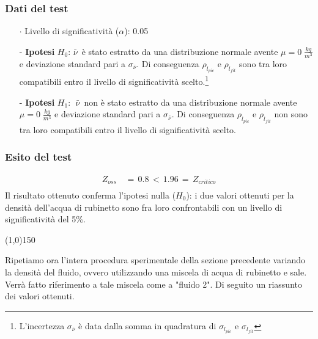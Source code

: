 \documentclass{article}
\begin{document}
\subsubsection{Dati del test}
\begin{itemize}
    \item [$\cdot$] Livello di significatività ($\alpha$): 0.05
    \item [-] \textbf{Ipotesi} $H_0$: $\bar{\nu}\,$ è stato estratto da una distribuzione normale avente $\mu = 0\;\frac{kg}{m^3}$ e deviazione standard pari a $\sigma_{\bar{\nu}}$. Di conseguenza $\rho_{l_{pic}}$ e $\rho_{l_{fit}}$ sono tra loro compatibili entro il livello di significatività scelto.\footnote{L'incertezza $\sigma_{\bar{\nu}}$ è data dalla somma in quadratura di $\sigma_{l_{pic}}$ e $\sigma_{l_{fit}}$}
    \item [-] \textbf{Ipotesi} $H_1$: $\;\bar{\nu}\,$ non è stato estratto da una distribuzione normale avente $\mu = 0\;\frac{kg}{m^3}$ e deviazione standard pari a $\sigma_{\bar{\nu}}$. Di conseguenza $\rho_{l_{pic}}$ e $\rho_{l_{fit}}$ non sono tra loro compatibili entro il livello di significatività scelto.
\end{itemize}
\subsubsection{Esito del test}
\begin{equation*}
\begin{split}
    Z_{oss} \,&= \,0.8 \,< \,1.96 \,= \,Z_{critico} \\[0.2cm]
\end{split}
\end{equation*}
Il risultato ottenuto conferma l'ipotesi nulla ($H_0$): i due valori ottenuti per la densità dell'acqua di rubinetto sono fra loro confrontabili con un livello di significatività del 5\%.
\vspace{0.5cm}
\begin{center}
    \line(1,0){150}
\end{center}
\vspace{0.5cm}
\noindent Ripetiamo ora l'intera procedura sperimentale della sezione precedente variando la densità del fluido, ovvero utilizzando una miscela di acqua di rubinetto e sale. Verrà fatto riferimento a tale miscela come a "fluido 2". Di seguito un riassunto dei valori ottenuti.
\end{document}
